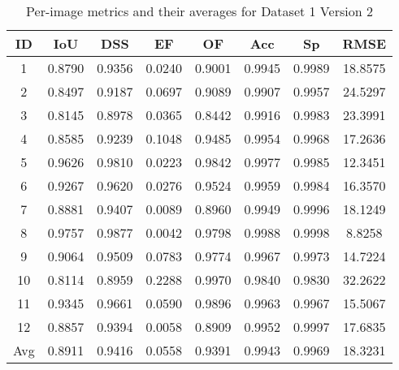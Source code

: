 \documentclass[12pt]{article}
\begin{document}
\begin{table}[h]
\centering
\begin{tabular}{|c|c|c|c|c|c|c|c|}
\hline
ID & IoU & DSS & EF & OF & Acc & Sp & RMSE \\
\hline
1 & 0.8790 & 0.9356 & 0.0240 & 0.9001 & 0.9945 & 0.9989 & 18.8575 \\
2 & 0.8497 & 0.9187 & 0.0697 & 0.9089 & 0.9907 & 0.9957 & 24.5297 \\
3 & 0.8145 & 0.8978 & 0.0365 & 0.8442 & 0.9916 & 0.9983 & 23.3991 \\
4 & 0.8585 & 0.9239 & 0.1048 & 0.9485 & 0.9954 & 0.9968 & 17.2636 \\
5 & 0.9626 & 0.9810 & 0.0223 & 0.9842 & 0.9977 & 0.9985 & 12.3451 \\
6 & 0.9267 & 0.9620 & 0.0276 & 0.9524 & 0.9959 & 0.9984 & 16.3570 \\
7 & 0.8881 & 0.9407 & 0.0089 & 0.8960 & 0.9949 & 0.9996 & 18.1249 \\
8 & 0.9757 & 0.9877 & 0.0042 & 0.9798 & 0.9988 & 0.9998 & 8.8258 \\
9 & 0.9064 & 0.9509 & 0.0783 & 0.9774 & 0.9967 & 0.9973 & 14.7224 \\
10 & 0.8114 & 0.8959 & 0.2288 & 0.9970 & 0.9840 & 0.9830 & 32.2622 \\
11 & 0.9345 & 0.9661 & 0.0590 & 0.9896 & 0.9963 & 0.9967 & 15.5067 \\
12 & 0.8857 & 0.9394 & 0.0058 & 0.8909 & 0.9952 & 0.9997 & 17.6835 \\
\hline
Avg & 0.8911 & 0.9416 & 0.0558 & 0.9391 & 0.9943 & 0.9969 & 18.3231 \\
\hline
\end{tabular}
\caption{Per-image metrics and their averages for Dataset 1 Version 2}
\end{table}
\end{document}
